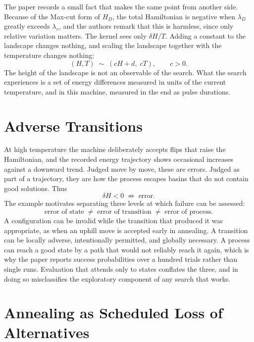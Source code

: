 \documentclass[11pt]{article}
\theoremstyle{definition}
\theoremstyle{remark}
\begin{document}
The paper records a small fact that makes the same point from another side. Because of the Max-cut form of $H_D$, the total Hamiltonian is negative when $\lambda_D$ greatly exceeds $\lambda_v$, and the authors remark that this is harmless, since only relative variation matters. The kernel sees only $\delta H / T$. Adding a constant to the landscape changes nothing, and scaling the landscape together with the temperature changes nothing:
\begin{equation}
(H, T) \;\sim\; (cH + d,\; cT), \qquad c > 0 .
\end{equation}
The height of the landscape is not an observable of the search. What the search experiences is a set of energy differences measured in units of the current temperature, and in this machine, measured in the end as pulse durations.

\section{Adverse Transitions}

At high temperature the machine deliberately accepts flips that raise the Hamiltonian, and the recorded energy trajectory shows occasional increases against a downward trend. Judged move by move, these are errors. Judged as part of a trajectory, they are how the process escapes basins that do not contain good solutions. Thus
\begin{equation}
\delta H < 0 \;\not\Rightarrow\; \text{error}.
\end{equation}
The example motivates separating three levels at which failure can be assessed:
\begin{equation}
\text{error of state} \;\neq\; \text{error of transition} \;\neq\; \text{error of process}.
\end{equation}
A configuration can be invalid while the transition that produced it was appropriate, as when an uphill move is accepted early in annealing. A transition can be locally adverse, intentionally permitted, and globally necessary. A process can reach a good state by a path that would not reliably reach it again, which is why the paper reports success probabilities over a hundred trials rather than single runs. Evaluation that attends only to states conflates the three, and in doing so misclassifies the exploratory component of any search that works.

\section{Annealing as Scheduled Loss of Alternatives}
\end{document}
